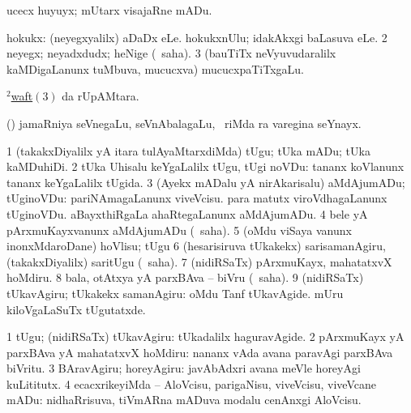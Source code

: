 \bentry
{} 
\gl{\akirx}
\expl{}
\bmng
ucecx huyuyx; mUtarx visajaRne mADu. 
\emng
\eentry

\bentry
{} 
\gl{\saMkiSx}
\expl{}
\bmng
{} 
\emng
\eentry

\bentry
{} 
\gl{\nA}
\expl{}
\bmng
\bnum
{} hokukx: 
\banum
{} (neyegxyalilx) aDaDx eLe. 
 hokukxnUlu; idakAkxgi baLasuva eLe. 
\eanum
\numie
\num{2} neyegx; neyadxdudx; heNige (\rUpa\ saha). 
\num{3} (bauTiTx neVyuvudaralilx kaMDigaLanunx tuMbuva, mucucxva) mucucxpaTiTxgaLu. 
\enum
\emng
\eentry

\bentry
{} 
\gl{\nA}
\expl{}
\bmng
\hyperlink{waft(2)3}{$^2$waft\((3)\)} da rUpAMtara. 
\emng
\eentry

\bentry 
{} 
\gl{\nA}
\expl{\G}
\bmng
(\ca) jamaRniya seVnegaLu, seVnAbalagaLu, \kanmu\ riMda ra varegina seYnayx. 
\emng
\eentry

\bentry
{} 
\gl{\sakirx}
\expl{}
\bmng
\bnum
\num{1} (takakxDiyalilx yA itara tulAyaMtarxdiMda) tUgu; tUka mADu; tUka kaMDuhiDi. 
\num{2} tUka Uhisalu keYgaLalilx tUgu, tUgi noVDu:  tananx koVlanunx tananx keYgaLalilx tUgida. 
\num{3} (Ayekx mADalu yA nirAkarisalu) aMdAjumADu; tUginoVDu:  pariNAmagaLanunx viveVcisu.  para matutx viroVdhagaLanunx tUginoVDu.  aBayxthiRgaLa ahaRtegaLanunx aMdAjumADu. 
\num{4} bele yA pArxmuKayxvanunx aMdAjumADu (\akirx\ saha). 
\num{5} (oMdu viSaya \mo vanunx inonxMdaroDane) hoVlisu; tUgu 
\num{6} (hesarisiruva tUkakekx) sarisamanAgiru, (takakxDiyalilx) saritUgu (\akirx\ saha). 
\num{7} (nidiRSaTx) pArxmuKayx, mahatatxvX hoMdiru. 
\num{8} bala, otAtxya yA parxBAva -- biVru (\akirx\ saha). 
\num{9} (nidiRSaTx) tUkavAgiru; tUkakekx samanAgiru:  oMdu Tanf tUkavAgide.  mUru kiloVgaLaSuTx tUgutatxde. 
\enum
\emng

\noindent 
\gl{\akirx}
\expl{}
\bmng
\bnum
\num{1} tUgu; (nidiRSaTx) tUkavAgiru:  tUkadalilx haguravAgide. 
\num{2} pArxmuKayx yA parxBAva yA mahatatxvX hoMdiru:  nananx vAda avana paravAgi parxBAva biVritu. 
\num{3} BAravAgiru; horeyAgiru:  javAbAdxri avana meVle horeyAgi kuLititutx. 
\num{4} ecacxrikeyiMda -- AloVcisu, parigaNisu, viveVcisu, viveVcane mADu:  nidhaRrisuva, tiVmARna mADuva modalu cenAnxgi AloVcisu. 
\enum
\emng

